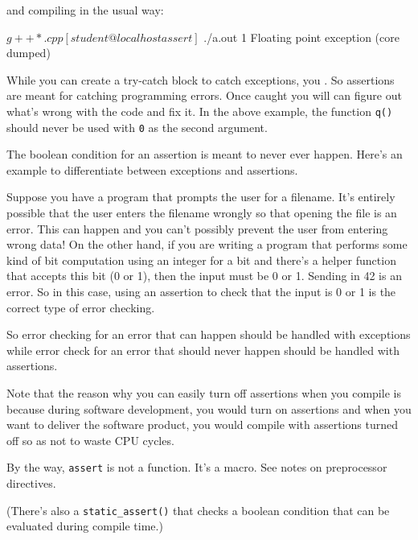 and compiling in the usual way:

\begin{console}
$ g++ *.cpp
[student@localhost assert]$ ./a.out
1
Floating point exception (core dumped)
\end{console}

While you can create a try-catch block to catch exceptions, you
. So assertions are meant for catching
programming errors. Once caught you will can figure out
what's wrong with the code and fix it. In the above
example, the function \texttt{q()} should never be used with \texttt{0} as
the second argument.

The boolean condition for an assertion is meant to never ever happen.
Here's an example to differentiate between exceptions
and assertions.

Suppose you have a program that prompts the user for a filename.
It's entirely possible that the user enters the filename
wrongly so that opening the file is an error. This can happen and you
can't possibly prevent the user from entering wrong
data! On the other hand, if you are writing a program that performs some
kind of bit computation using an integer for a bit and
there's a helper function that accepts this bit (0 or
1), then the input must be 0 or 1. Sending in 42 is an error. So in this
case, using an assertion to check that the input is 0 or 1 is the
correct type of error checking.

So error checking for an error that can happen should be handled with
exceptions while error check for an error that should never happen
should be handled with assertions.

Note that the reason why you can easily turn off assertions when you
compile is because during software development, you would turn on
assertions and when you want to deliver the software product, you would
compile with assertions turned off so as not to waste CPU cycles.

By the way, \texttt{assert} is not a function. It's a
macro. See notes on preprocessor directives.

(There's also a \verb!static_assert()! that checks a
boolean condition that can be evaluated during compile time.)

